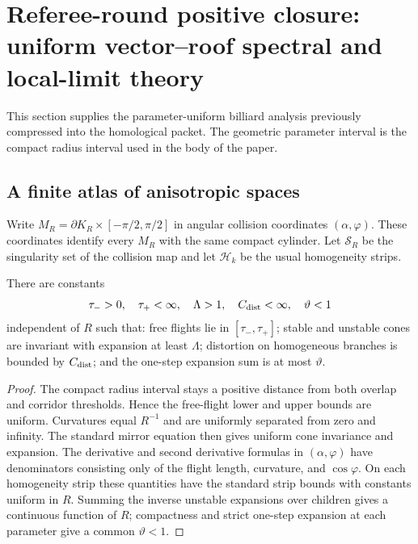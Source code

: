 \section{Referee-round positive closure: uniform vector--roof spectral and local-limit theory}
\label{sec:rr2-a2}

This section supplies the parameter-uniform billiard analysis previously
compressed into the homological packet.  The geometric parameter interval is
the compact radius interval used in the body of the paper.

\subsection{A finite atlas of anisotropic spaces}

Write \(M_R=\partial K_R\times[-\pi/2,\pi/2]\) in angular collision
coordinates \((\alpha,\varphi)\).  These coordinates identify every \(M_R\)
with the same compact cylinder.  Let \(\mathcal S_R\) be the singularity set
of the collision map and let \(\mathcal H_k\) be the usual homogeneity strips.

\begin{lemma}
\label{lem:rr2-a2-geometry}
There are constants
\[
 \tau_->0,\quad \tau_+<\infty,\quad
 \Lambda>1,\quad C_{\rm dist}<\infty,\quad \vartheta<1
\]
independent of \(R\) such that: free flights lie in
\([\tau_-,\tau_+]\); stable and unstable cones are invariant with expansion
at least \(\Lambda\); distortion on homogeneous branches is bounded by
\(C_{\rm dist}\); and the one-step expansion sum is at most \(\vartheta\).
\end{lemma}

\begin{proof}
The compact radius interval stays a positive distance from both overlap and
corridor thresholds.  Hence the free-flight lower and upper bounds are
uniform.  Curvatures equal \(R^{-1}\) and are uniformly separated from zero
and infinity.  The standard mirror equation then gives uniform cone
invariance and expansion.  The derivative and second derivative formulas in
\((\alpha,\varphi)\) have denominators consisting only of the flight length,
curvature, and \(\cos\varphi\).  On each homogeneity strip these quantities
have the standard strip bounds with constants uniform in \(R\).  Summing the
inverse unstable expansions over children gives a continuous function of
\(R\); compactness and strict one-step expansion at each parameter give a
common \(\vartheta<1\).
\end{proof}

